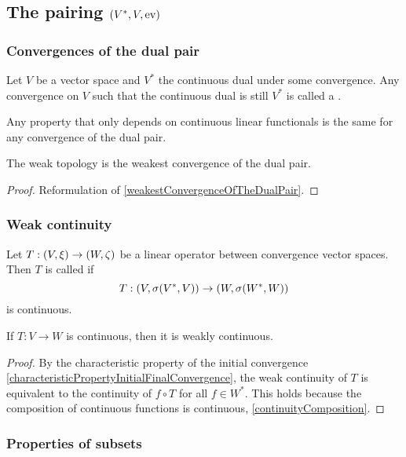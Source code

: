 \subsection{The pairing $\sSet{V^*, V, \evalMap}$}
\subsubsection{Convergences of the dual pair}
\begin{definition}
Let $V$ be a vector space and $V^*$ the continuous dual under some convergence. Any convergence on $V$ such that the continuous dual is still $V^*$ is called a .
\end{definition}
Any property that only depends on continuous linear functionals is the same for any convergence of the dual pair.

\begin{proposition}
The weak topology is the weakest convergence of the dual pair.
\end{proposition}
\begin{proof}
Reformulation of \ref{weakestConvergenceOfTheDualPair}.
\end{proof}

\subsubsection{Weak continuity}
\begin{definition}
Let $T: \sSet{V,\xi} \to \sSet{W,\zeta}$ be a linear operator between convergence vector spaces. Then $T$ is called  if
\[ T: \sSet{V, \sigma(V^*,V)} \to \sSet{W, \sigma(W^*,W)} \]
is continuous.
\end{definition}

\begin{lemma} \label{continuityImpliesWeakContinuity}
If $T: V\to W$ is continuous, then it is weakly continuous.
\end{lemma}
\begin{proof}
By the characteristic property of the initial convergence \ref{characteristicPropertyInitialFinalConvergence}, the weak continuity of $T$ is equivalent to the continuity of $f\circ T$ for all $f\in W^*$. This holds because the composition of continuous functions is continuous, \ref{continuityComposition}.
\end{proof}

\subsubsection{Properties of subsets}

